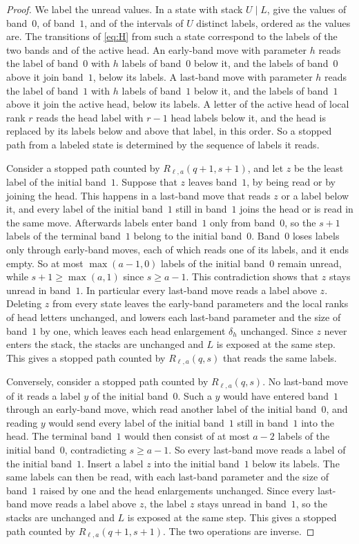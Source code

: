 \documentclass[11pt,reqno]{amsart}
\theoremstyle{definition}
\theoremstyle{remark}
\begin{document}
\begin{proof}
We label the unread values.  In a state with stack $U\mid L$, give the
values of band~$0$, of band~$1$, and of the intervals of $U$ distinct
labels, ordered as the values are.  The transitions of
\eqref{eq:H} from such a state correspond to the labels of the two bands and
of the active head.  An early-band move with parameter $h$ reads the label
of band~$0$ with $h$ labels of band~$0$ below it, and the labels of
band~$0$ above it join band~$1$, below its labels.  A last-band move with
parameter $h$ reads the label of band~$1$ with $h$ labels of band~$1$ below
it, and the labels of band~$1$ above it join the active head, below its
labels.  A letter of the active head of local rank $r$ reads the head
label with $r-1$ head labels below it, and the head is replaced by its labels
below and above that label, in this order.  So a stopped path from a
labeled state is determined by the sequence of labels it reads.

Consider a stopped path counted by $R_{\ell,a}(q+1,s+1)$, and let $z$ be the
least label of the initial band~$1$.  Suppose that $z$ leaves band~$1$, by
being read or by joining the head.  This happens in a last-band move that
reads $z$ or a label below it, and every label of the initial band~$1$ still
in band~$1$ joins the head or is read in the same move.  Afterwards labels
enter band~$1$ only from band~$0$, so the $s+1$ labels of the terminal
band~$1$ belong to the initial band~$0$.  Band~$0$ loses labels only through
early-band moves, each of which reads one of its labels, and it ends empty.
So at most $\max(a-1,0)$ labels of the initial band~$0$ remain unread, while
$s+1\geq\max(a,1)$ since $s\geq a-1$.  This contradiction shows that $z$
stays unread in band~$1$.  In particular every last-band move reads a label
above $z$.  Deleting $z$ from every state leaves the early-band parameters
and the local ranks of head letters unchanged, and lowers each last-band
parameter and the
size of band~$1$ by one, which leaves each head enlargement $\delta_h$
unchanged.  Since $z$ never enters the stack, the stacks are unchanged and
$L$ is exposed at the same step.  This gives a stopped path counted by
$R_{\ell,a}(q,s)$ that reads the same labels.

Conversely, consider a stopped path counted by $R_{\ell,a}(q,s)$.  No
last-band move of it reads a label $y$ of the initial band~$0$.  Such a $y$
would have entered band~$1$ through an early-band move, which read another
label of the initial band~$0$, and reading $y$ would send every label of the
initial band~$1$ still in band~$1$ into the head.  The terminal band~$1$ would then consist of
at most $a-2$ labels of the initial band~$0$, contradicting $s\geq a-1$.  So
every last-band move reads a label of the initial band~$1$.  Insert a label
$z$ into the initial band~$1$ below its labels.  The same labels can then be
read, with each last-band parameter and the size of band~$1$ raised by one
and the head enlargements unchanged.  Since every last-band move reads a
label above $z$, the label $z$ stays unread in band~$1$, so the stacks are
unchanged and $L$ is exposed at the same step.  This gives a stopped path
counted by $R_{\ell,a}(q+1,s+1)$.  The two operations
are inverse.
\end{proof}
\end{document}

